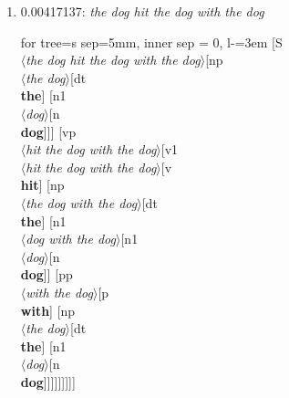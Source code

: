 \documentclass[11pt]{article}
\begin{document}
\begin{enumerate}
	\item  0.00417137: \textit{the dog hit the dog with the dog} \\[0.5em]
	\begin{forest}
	for tree={s sep=5mm, inner sep = 0, l-=3em}
	[S\\$\langle$\textit{the dog hit the dog with the dog}$\rangle$[np\\$\langle$\textit{the dog}$\rangle$[dt\\\textbf{the}] [n1\\$\langle$\textit{dog}$\rangle$[n\\\textbf{dog}]]] [vp\\$\langle$\textit{hit the dog with the dog}$\rangle$[v1\\$\langle$\textit{hit the dog with the dog}$\rangle$[v\\\textbf{hit}] [np\\$\langle$\textit{the dog with the dog}$\rangle$[dt\\\textbf{the}] [n1\\$\langle$\textit{dog with the dog}$\rangle$[n1\\$\langle$\textit{dog}$\rangle$[n\\\textbf{dog}]] [pp\\$\langle$\textit{with the dog}$\rangle$[p\\\textbf{with}] [np\\$\langle$\textit{the dog}$\rangle$[dt\\\textbf{the}] [n1\\$\langle$\textit{dog}$\rangle$[n\\\textbf{dog}]]]]]]]]]
	\end{forest}
	\newpage

\end{enumerate}
\end{document}
